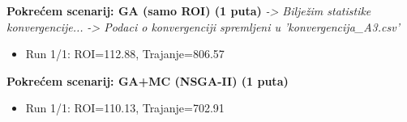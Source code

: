 \textbf{Pokrećem scenarij: GA (samo ROI) (1 puta)}
\textit{-> Bilježim statistike konvergencije...}
\textit{-> Podaci o konvergenciji spremljeni u 'konvergencija\_A3.csv'}
\begin{itemize}
    \item Run 1/1: ROI=112.88, Trajanje=806.57
\end{itemize}

\textbf{Pokrećem scenarij: GA+MC (NSGA-II) (1 puta)}
\begin{itemize}
    \item Run 1/1: ROI=110.13, Trajanje=702.91
\end{itemize}


